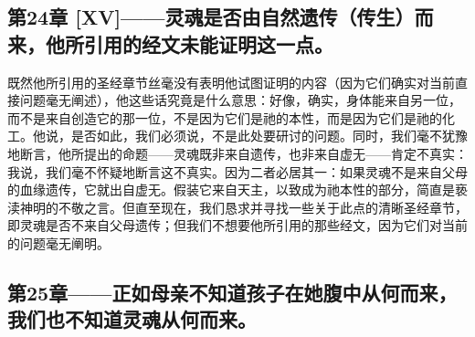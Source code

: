 
\subsection{第24章 [XV]——灵魂是否由自然遗传（传生）而来，他所引用的经文未能证明这一点。}

既然他所引用的圣经章节丝毫没有表明他试图证明的内容（因为它们确实对当前直接问题毫无阐述），他这些话究竟是什么意思：好像，确实，身体能来自另一位，而不是来自创造它的那一位，不是因为它们是祂的本性，而是因为它们是祂的化工。他说，是否如此，我们必须说，不是此处要研讨的问题。同时，我们毫不犹豫地断言，他所提出的命题——灵魂既非来自遗传，也非来自虚无——肯定不真实：我说，我们毫不怀疑地断言这不真实。因为二者必居其一：如果灵魂不是来自父母的血缘遗传，它就出自虚无。假装它来自天主，以致成为祂本性的部分，简直是亵渎神明的不敬之言。但直至现在，我们恳求并寻找一些关于此点的清晰圣经章节，即灵魂是否不来自父母遗传；但我们不想要他所引用的那些经文，因为它们对当前的问题毫无阐明。\par


\subsection{第25章——正如母亲不知道孩子在她腹中从何而来，我们也不知道灵魂从何而来。}


